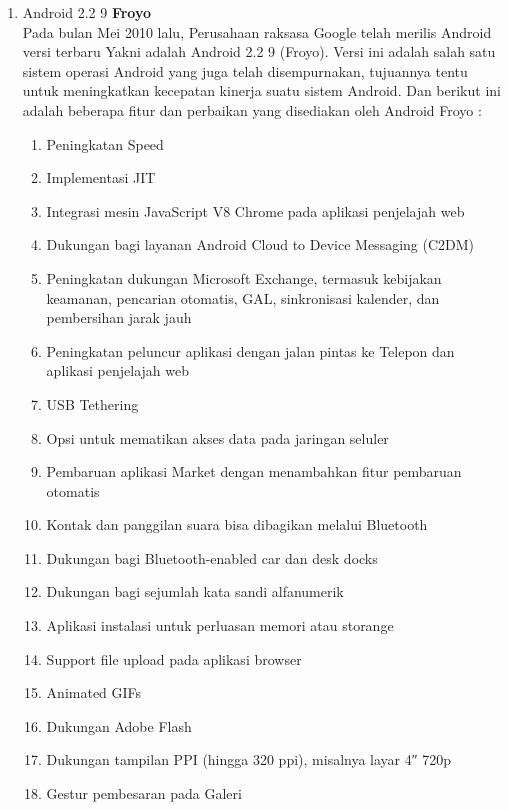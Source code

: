 \begin{enumerate}
\item Android 2.2 9 \textbf{Froyo}\\
Pada bulan Mei 2010 lalu, Perusahaan raksasa Google telah merilis Android versi terbaru Yakni adalah Android 2.2 9 (Froyo). Versi ini adalah salah satu sistem operasi Android yang juga telah disempurnakan, tujuannya tentu untuk meningkatkan kecepatan kinerja suatu sistem Android. Dan berikut ini adalah beberapa fitur dan perbaikan yang disediakan oleh Android Froyo :
\begin{enumerate}
    \item Peningkatan Speed
    \item Implementasi JIT
    \item Integrasi mesin JavaScript V8 Chrome pada aplikasi penjelajah web
    \item Dukungan bagi layanan Android Cloud to Device Messaging (C2DM)
    \item Peningkatan dukungan Microsoft Exchange, termasuk kebijakan keamanan, pencarian otomatis, GAL, sinkronisasi kalender, dan pembersihan jarak jauh
    \item Peningkatan peluncur aplikasi dengan jalan pintas ke Telepon dan aplikasi penjelajah web
    \item USB Tethering
    \item Opsi untuk mematikan akses data pada jaringan seluler
    \item Pembaruan aplikasi Market dengan menambahkan fitur pembaruan otomatis
    \item Kontak dan panggilan suara bisa dibagikan melalui Bluetooth
    \item Dukungan bagi Bluetooth-enabled car dan desk docks
    \item Dukungan bagi sejumlah kata sandi alfanumerik
    \item Aplikasi instalasi untuk perluasan memori atau storange
    \item Support file upload pada aplikasi browser
    \item Animated GIFs
    \item Dukungan Adobe Flash
    \item Dukungan tampilan PPI (hingga 320 ppi), misalnya layar 4″ 720p
    \item Gestur pembesaran pada Galeri
\end{enumerate}


\end{enumerate}
